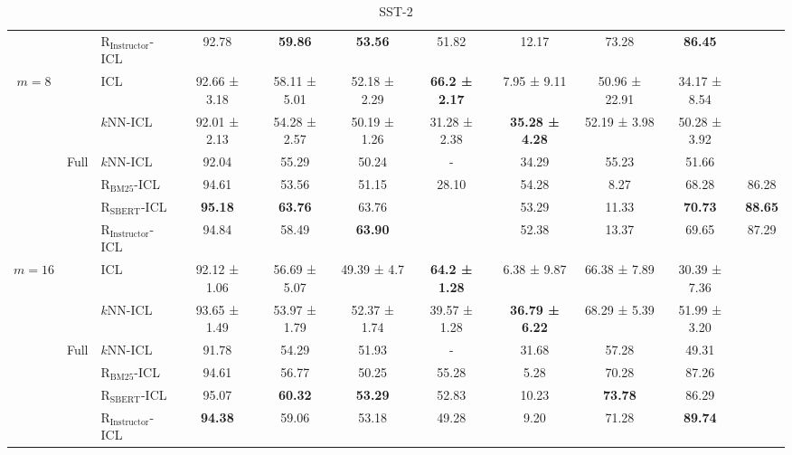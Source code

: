 \begin{table*}[]
\begin{tabular}{ccl@{\hspace{-0.5\tabcolsep}}c|ccccccc}
         & & $\text{R}_{\text{Instructor}}$-ICL & 92.78 & \textbf{59.86} & \textbf{53.56} & 51.82 & 12.17 & 73.28 & \textbf{86.45}\\
         \multirow{6}{*}{{$m=8$}} & \rowcolor{lightgray} {} & ICL & 92.66 ± 3.18 & 58.11 ± 5.01	 &	52.18 ± 2.29 & \textbf{66.2 ± 2.17} & 7.95 ± 9.11 & 50.96 ± 22.91 & 34.17 ± 8.54 \\
         & \rowcolor{lightgray} \multirow{-2}{*}{Random} & $k$NN-ICL & 92.01 ± 2.13	& 54.28 ± 2.57 & 50.19 ± 1.26	& 31.28 ± 2.38 & \textbf{35.28 ± 4.28} & 52.19 ± 3.98 & 50.28 ± 3.92 \\ 
     & \multirow{4}{*}{Full} & $k$NN-ICL & 92.04 & 55.29 & 50.24 & - & {34.29} & 55.23 & {51.66} \\
         & & $\text{R}_{\text{BM25}}$-ICL & 94.61 & 53.56 & 51.15 & 28.10 & 54.28 & 8.27 & 68.28 & 86.28 \\ 
         & & $\text{R}_{\text{SBERT}}$-ICL & \textbf{95.18} & \textbf{63.76} & 63.76 & {} & 53.29 & 11.33 & \textbf{70.73} & \textbf{88.65} \\ 
         & & $\text{R}_{\text{Instructor}}$-ICL & 94.84 & 58.49 & \textbf{63.90} & {} & 52.38 & 13.37 & 69.65 & 87.29 \\
        \multirow{6}{*}{{$m=16$}} & \rowcolor{lightgray} {} & ICL & 92.12 ± 1.06	& 56.69 ± 5.07 & 49.39 ± 4.7 & \textbf{64.2 ± 1.28} & 6.38 ± 9.87 & 66.38 ± 7.89 & 30.39 ± 7.36 \\
         & \rowcolor{lightgray} \multirow{-2}{*}{Random} & $k$NN-ICL & 93.65 ± 1.49 & 53.97 ± 1.79 &	52.37 ± 1.74 & 39.57 ± 1.28 & \textbf{36.79 ± 6.22} & 68.29 ± 5.39 & 51.99 ± 3.20 \\ 
     & \multirow{4}{*}{Full} & $k$NN-ICL & 91.78 & 54.29 & 51.93 & - & {31.68} & 57.28 & {49.31} \\
         & & $\text{R}_{\text{BM25}}$-ICL & 94.61 & 56.77 & 50.25 & 55.28 & 5.28 & 70.28 & 87.26 \\ 
         & & $\text{R}_{\text{SBERT}}$-ICL & 95.07 & \textbf{60.32} & \textbf{53.29} & 52.83 & 10.23 & \textbf{73.78} & 86.29 \\ 
         & & $\text{R}_{\text{Instructor}}$-ICL & \textbf{94.38} & 59.06 & 53.18 & 49.28 & 9.20 & {71.28} & \textbf{89.74} \\
    \end{tabular}
    \caption{SST-2}
\end{table*}